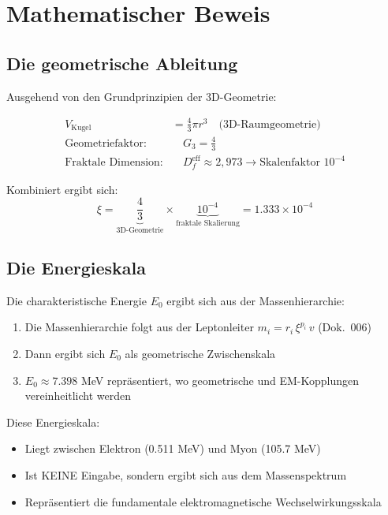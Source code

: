 	\section{Mathematischer Beweis}
	
	\subsection{Die geometrische Ableitung}
	
	Ausgehend von den Grundprinzipien der 3D-Geometrie:
	
	\begin{align}
		V_{\text{Kugel}} &= \frac{4}{3}\pi r^3 \quad \text{(3D-Raumgeometrie)}\\
		\text{Geometriefaktor:} & \quad G_3 = \frac{4}{3}\\
		\text{Fraktale Dimension:} & \quad D_f^{\text{eff}} \approx 2{,}973 \rightarrow \text{Skalenfaktor } 10^{-4}
	\end{align}
	
	Kombiniert ergibt sich:
	\begin{equation}
		\xi = \underbrace{\frac{4}{3}}_{\text{3D-Geometrie}} \times \underbrace{10^{-4}}_{\text{fraktale Skalierung}} = 1.333 \times 10^{-4}
	\end{equation}
	
	\subsection{Die Energieskala}
	
	Die charakteristische Energie $E_0$ ergibt sich aus der Massenhierarchie:
	
	\begin{enumerate}
		\item Die Massenhierarchie folgt aus der Leptonleiter $m_i = r_i\,\xi^{p_i}\,v$ (Dok.~006)
		\item Dann ergibt sich $E_0$ als geometrische Zwischenskala
		\item $E_0 \approx 7.398$ MeV repräsentiert, wo geometrische und EM-Kopplungen vereinheitlicht werden
	\end{enumerate}
	
	Diese Energieskala:
	\begin{itemize}
		\item Liegt zwischen Elektron (0.511 MeV) und Myon (105.7 MeV)
		\item Ist KEINE Eingabe, sondern ergibt sich aus dem Massenspektrum
		\item Repräsentiert die fundamentale elektromagnetische Wechselwirkungsskala
	\end{itemize}
	
